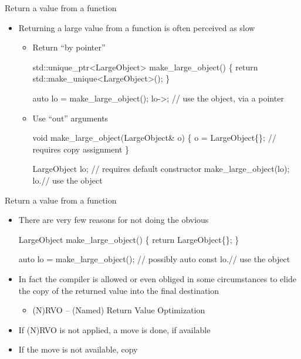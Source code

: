 \begin{frame}[fragile]{Return a value from a function}
  \begin{itemize}
  \item Returning a large value from a function is often perceived as slow
    \begin{itemize}

    \item<2-> Return ``by pointer''
      \begin{codeblock}
std::unique\_ptr<LargeObject> make\_large\_object() \{
  return std::make\_unique<LargeObject>();
\}

auto lo = make\_large\_object();
lo->\ddd; // use the object, via a pointer\end{codeblock}

     \item<3-> Use ``out'' arguments
       \begin{codeblock}
void make\_large\_object(LargeObject& o) \{
  o = LargeObject\{\};   // requires copy assignment
\}

LargeObject lo;        // requires default constructor
make\_large\_object(lo);
lo.\ddd                 // use the object\end{codeblock}

    \end{itemize}
  \end{itemize}

\end{frame}

\begin{frame}[fragile]{Return a value from a function \insertcontinuationtext}

  \begin{itemize}
  \item There are very few reasons for not doing the obvious
    \begin{codeblock}
LargeObject make\_large\_object() \{
  return LargeObject\{\};
\}

auto lo = make\_large\_object(); // possibly auto const
lo.\ddd                         // use the object\end{codeblock}

  \item In fact the compiler is allowed or even obliged in some circumstances to
    elide the copy of the returned value into the final destination
    \begin{itemize}
    \item (N)RVO -- (Named) Return Value Optimization
    \end{itemize}
  \item If (N)RVO is not applied, a move is done, if available
  \item If the move is not available, copy
  \end{itemize}
\end{frame}

